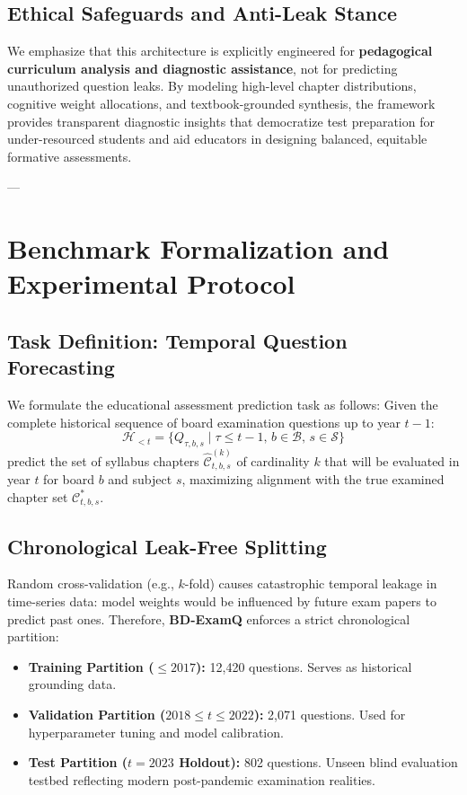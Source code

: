 \documentclass[11pt,a4paper]{article}
\begin{document}
\subsection{Ethical Safeguards and Anti-Leak Stance}
We emphasize that this architecture is explicitly engineered for \textbf{pedagogical curriculum analysis and diagnostic assistance}, not for predicting unauthorized question leaks. By modeling high-level chapter distributions, cognitive weight allocations, and textbook-grounded synthesis, the framework provides transparent diagnostic insights that democratize test preparation for under-resourced students and aid educators in designing balanced, equitable formative assessments.

---

\section{Benchmark Formalization and Experimental Protocol}
\label{sec:benchmark}

\subsection{Task Definition: Temporal Question Forecasting}
We formulate the educational assessment prediction task as follows: Given the complete historical sequence of board examination questions up to year $t-1$:
\begin{equation}
    \mathcal{H}_{<t} = \{ Q_{\tau, b, s} \mid \tau \le t-1, \, b \in \mathcal{B}, \, s \in \mathcal{S} \}
\end{equation}
predict the set of syllabus chapters $\hat{\mathcal{C}}_{t, b, s}^{(k)}$ of cardinality $k$ that will be evaluated in year $t$ for board $b$ and subject $s$, maximizing alignment with the true examined chapter set $\mathcal{C}_{t, b, s}^*$.

\subsection{Chronological Leak-Free Splitting}
Random cross-validation (e.g., $k$-fold) causes catastrophic temporal leakage in time-series data: model weights would be influenced by future exam papers to predict past ones. Therefore, \textbf{BD-ExamQ} enforces a strict chronological partition:
\begin{itemize}[noitemsep,topsep=2pt]
    \item \textbf{Training Partition ($\le 2017$):} 12,420 questions. Serves as historical grounding data.
    \item \textbf{Validation Partition ($2018 \le t \le 2022$):} 2,071 questions. Used for hyperparameter tuning and model calibration.
    \item \textbf{Test Partition ($t = 2023$ Holdout):} 802 questions. Unseen blind evaluation testbed reflecting modern post-pandemic examination realities.
\end{itemize}
\end{document}
